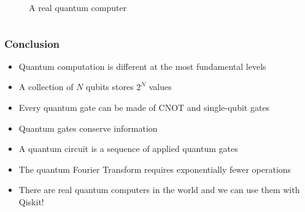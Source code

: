\documentclass[aspectratio=169]{beamer}
\begin{document}
\begin{frame}
\begin{columns}
\begin{column}{0.5\textwidth}
\begin{figure}[placement]
                \caption{A real quantum computer} %
            \end{figure}
        \end{column}
    \end{columns}
\end{frame}

\begin{frame}
    \frametitle{Conclusion}

    \begin{itemize}
        \item Quantum computation is different at the most fundamental levels
        \item A collection of $N$ qubits stores $2^N$ values
        \item Every quantum gate can be made of CNOT and single-qubit gates
        \item Quantum gates conserve information
        \item A quantum circuit is a sequence of applied quantum gates
        \item The quantum Fourier Transform requires exponentially fewer operations
        \item There are real quantum computers in the world and we can use them with Qiskit!
    \end{itemize}

\end{frame}
\end{document}
